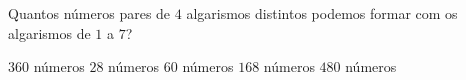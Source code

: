 Quantos números pares de $4$ algarismos distintos podemos formar com os algarismos de $1$ a $7$?

$360$ números
$28$ números
$60$ números
$168$ números
$480$ números



